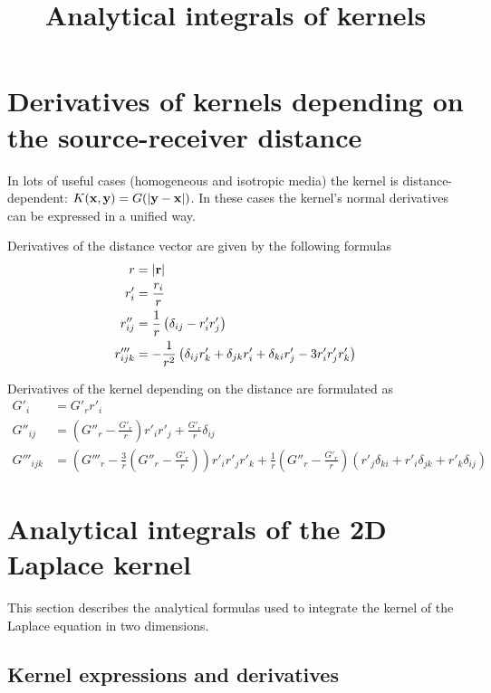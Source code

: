 \documentclass[a4paper,11pt]{article}
\title {Analytical integrals of kernels}
\begin{document}
\maketitle

\tableofcontents

\section{Derivatives of kernels depending on the source-receiver distance}

In lots of useful cases (homogeneous and isotropic media) the kernel is distance-dependent: $K({\bf x}, {\bf y}) = G(|{\bf y} - {\bf x}|)$.
In these cases the kernel's normal derivatives can be expressed in a unified way.

Derivatives of the distance vector are given by the following formulas
%
\begin{align}
	r &= |{\bf r}| \\
	r'_i &= \frac{r_i}{r} \\
	r''_{ij} &= \frac{1}{r} \left( \delta_{ij} - r'_i r'_j \right) \\
	r'''_{ijk} &= -\frac{1}{r^2} \left(
		\delta_{ij} r'_k + \delta_{jk} r'_i + \delta_{ki} r'_j - 3 r'_i r'_j r'_k
	\right)
\end{align}

Derivatives of the kernel depending on the distance are formulated as
%
\begin{align}
	G'_i &= G'_r r'_i \\
	G''_{ij} &= \left(G''_r - \frac{G'_r}{r} \right) r'_i r'_j +  \frac{G'_r}{r} \delta_{ij} \\
	G'''_{ijk} &=
	\left(G'''_r -\frac{3}{r} \left(G''_r  - \frac{G'_r}{r} \right) \right) r'_i r'_j r'_k
	+  \frac{1}{r} \left( G''_r  - \frac{G'_r}{r} \right)\left(
	   r'_j \delta_{ki}
	+  r'_i \delta_{jk}
	+  r'_k \delta_{ij}
	\right)
	\label{eq:derivatives_wrt_ij}
\end{align}


\section{Analytical integrals of the 2D Laplace kernel}

This section describes the analytical formulas used to integrate the kernel of the Laplace equation in two dimensions.

\subsection{Kernel expressions and derivatives}
\end{document}
